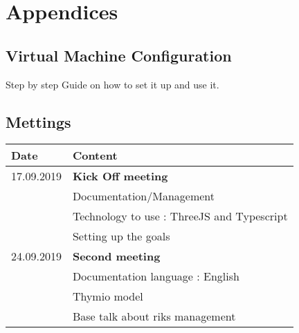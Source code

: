 \documentclass{scrartcl}
\begin{document}
\section{Appendices}
\subsection{Virtual Machine Configuration}
Step by step Guide on how to set it up and use it.
\subsection{Mettings}
\begin{tabular}{ | m{3cm} | m{10cm} | }
  \hline
  Date & Content \\
  \hline
  17.09.2019 & \textbf{Kick Off meeting}\\
  & Documentation/Management\\
  & Technology to use : ThreeJS and Typescript\\
  & Setting up the goals\\
  \hline
  24.09.2019 & \textbf{Second meeting} \\
  & Documentation language : English \\
  & Thymio model \\
  & Base talk about riks management \\
  \hline
\end{tabular}



\printbibliography[heading=bibintoc]
\end{document}
